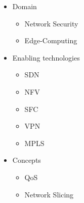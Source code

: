 \documentclass{article}
\begin{document}
\begin{itemize}
    \item Domain
    \begin{itemize}
        \item Network Security
        \item Edge-Computing
    \end{itemize}
    \item Enabling technologies
    \begin{itemize}
        \item SDN
        \item NFV
        \item SFC
        \item VPN
        \item MPLS
    \end{itemize}
    \item Concepts
    \begin{itemize}
        \item QoS
        \item Network Slicing
    \end{itemize}
\end{itemize}
\end{document}
